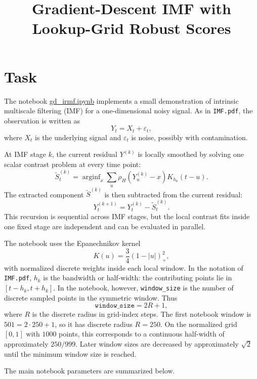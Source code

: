 \documentclass[11pt]{article}
\title{Gradient-Descent IMF with Lookup-Grid Robust Scores}
\author{}
\date{}
\begin{document}
\maketitle

\section{Task}

The notebook \href{https://github.com/mkuziuk/imf/blob/main/gd_irmf.ipynb}{gd\_irmf.ipynb}
implements a small demonstration of intrinsic multiscale filtering (IMF) for a
one-dimensional noisy signal. As in \texttt{IMF.pdf}, the observation is written as
\[
Y_t = X_t + \varepsilon_t,
\]
where \(X_t\) is the underlying signal and \(\varepsilon_t\) is noise, possibly with
contamination.

At IMF stage \(k\), the current residual \(Y^{(k)}\) is locally smoothed by solving
one scalar contrast problem at every time point:
\[
\widetilde S_t^{(k)}
= \operatorname{arginf}_x
\sum_u \rho_H\left(Y_u^{(k)} - x\right)K_{h_k}(t-u).
\]
The extracted component \(\widetilde S^{(k)}\) is then subtracted from the current
residual:
\[
Y_t^{(k+1)} = Y_t^{(k)} - \widetilde S_t^{(k)}.
\]
This recursion is sequential across IMF stages, but the local contrast fits inside one
fixed stage are independent and can be evaluated in parallel.

The notebook uses the Epanechnikov kernel
\[
K(u) = \frac{3}{4}(1 - |u|)^2_+,
\]
with normalized discrete weights inside each local window. In the notation of
\texttt{IMF.pdf}, \(h_k\) is the bandwidth or half-width: the contributing points
lie in \([t-h_k,t+h_k]\). In the notebook, however, \texttt{window\_size} is the
number of discrete sampled points in the symmetric window. Thus
\[
\texttt{window\_size}=2R+1,
\]
where \(R\) is the discrete radius in grid-index steps. The first notebook window is
\(501=2\cdot 250+1\), so it has discrete radius \(R=250\). On the normalized grid
\([0,1]\) with \(1000\) points, this corresponds to a continuous half-width of
approximately \(250/999\). Later window sizes are decreased by approximately
\(\sqrt{2}\) until the minimum window size is reached.

The main notebook parameters are summarized below.
\end{document}
